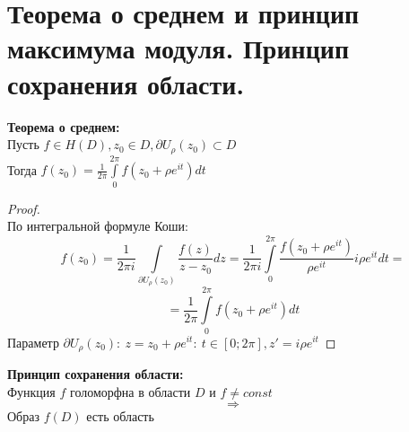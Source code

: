 \newpage
\section{Теорема о среднем и принцип максимума модуля. Принцип сохранения области.}

\textbf{Теорема о среднем:}\\[2mm]
Пусть $f \in H(D), z_0 \in D, \partial U_{\rho}(z_0)\subset D$\\
Тогда $f(z_0) = \frac{1}{2\pi} \int\limits_{0}^{2\pi} f(z_0+\rho e^{it})dt$

\begin{proof}
    \ \\
    По интегральной формуле Коши:
    $$f(z_0)=\frac{1}{2\pi i}\int\limits_{\partial U_{\rho}(z_0)}\frac{f(z)}{z-z_0}dz = \frac{1}{2\pi i} \int\limits_{0}^{2\pi}\frac{f(z_0+\rho e^{it})}{\rho e^{it}}i\rho e^{it}dt=$$
    $$=\frac{1}{2\pi}\int\limits_0^{2\pi}f(z_0+\rho e^{it})dt$$
    Параметр $\partial U_{\rho}(z_0): \ z=z_0+\rho e^{it}: \ t\in[0; 2\pi], z'=i\rho e^{it}$
\end{proof}

\textbf{Принцип сохранения области:}\\[2mm]
Функция $f$ голоморфна в области $D$ и $f\neq const$
$$\Rightarrow$$
Образ $f(D)$ есть область

